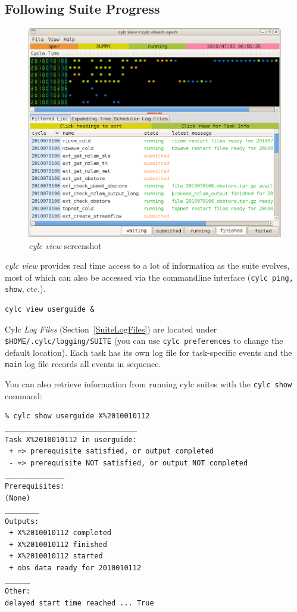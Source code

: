 \documentclass[11pt,a4paper]{article}
\begin{document}
\subsection{Following Suite Progress}
\label{QuickFollowingSuiteProgress}

\begin{figure}
    \begin{center}
        \includegraphics[width=12cm]{cylc-view-ecoconnect} 
    \end{center}
    \caption{\small {\em cylc view} screenshot}
    \label{fig-monitor} 
\end{figure} 

{\em cylc view} provides real time access to a lot of information as 
the suite evolves, most of which can also be accessed via the
commandline interface (\lstinline=cylc ping, show=, etc.).

\begin{lstlisting}
cylc view userguide &
\end{lstlisting}

Cylc {\em Log Files} (Section~\ref{SuiteLogFiles}) are located 
under \lstinline=$HOME/.cylc/logging/SUITE= (you can use
\lstinline=cylc preferences= to change the default location). Each task
has its own log file for task-specific events and the \lstinline=main=
log file records all events in sequence.

You can also retrieve information from running cylc suites with the 
\lstinline=cylc show= command:

\lstset{language=}
\begin{lstlisting}
% cylc show userguide X%2010010112
_______________________________
Task X%2010010112 in userguide:
 + => prerequisite satisfied, or output completed
 - => prerequisite NOT satisfied, or output NOT completed
______________
Prerequisites:
(None)
________
Outputs:
 + X%2010010112 completed
 + X%2010010112 finished
 + X%2010010112 started
 + obs data ready for 2010010112
______
Other:
delayed start time reached ... True
\end{lstlisting}
\end{document}
